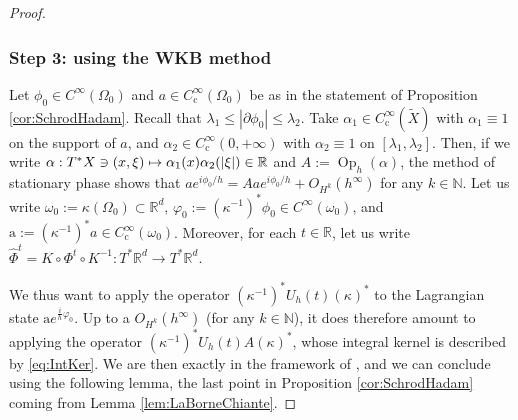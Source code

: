 \documentclass[10pt]{amsart}
\newcommand\mto{\mathchoice{\longmapsto}{\mapsto}{\mapsto}{\mapsto}}
\newcommand{\rc}{\mathrm{c}}
\DeclareMathOperator{\Op}{Op}
\theoremstyle{plain}
\theoremstyle{definition}
\newcommand{\N}{\mathbb{N}}
\newcommand{\R}{\mathbb{R}}
\begin{document}
\begin{proof}
\subsubsection*{Step 3: using the WKB method}
Let $\phi_0\in C^\infty(\Omega_0)$ and $a\in C_\rc^\infty(\Omega_0)$ be as in the statement of Proposition \ref{cor:SchrodHadam}. Recall that $\lambda_1\leq |\partial\phi_0|\leq \lambda_2$.
Take $\alpha_1\in C_\rc^\infty(\tilde{X})$ with $\alpha_1\equiv 1$ on the support of $a$, and $\alpha_2\in C_\rc^\infty(0, +\infty)$ with $\alpha_2\equiv 1$ on $[\lambda_1, \lambda_2]$. Then, if we write $\alpha : T^*X\ni (x,\xi) \mto \alpha_1(x) \alpha_2(|\xi|)\in \R$ and $A:= \Op_h (\alpha)$, the method of stationary phase shows that $a e^{i\phi_0/h} = A a e^{i\phi_0/h} + O_{H^k}(h^\infty)$ for any $k\in\N$. Let us write $\omega_0:= \kappa(\Omega_0)\subset \R^d$, $\varphi_0 := (\kappa^{-1})^*\phi_0\in C^\infty(\omega_0)$, and $\mathrm{a} := (\kappa^{-1})^*a\in C_\rc^\infty(\omega_0)$. Moreover, for each $t\in\R$, let us write $\widehat{\Phi}^t=K\circ\Phi^t\circ K^{-1}:T^*\R^d\to T^*\R^d$.

We thus want to apply the operator $(\kappa^{-1})^* U_h(t)(\kappa)^*$ to the Lagrangian state $\mathrm{a} e^{\frac{i}{h}\varphi_0}$. Up to a $O_{H^k}(h^\infty)$ (for any $k\in\N$), it does therefore amount to applying the operator $ (\kappa^{-1})^* U_h(t)A (\kappa)^*$, whose integral kernel is described by \eqref{eq:IntKer}.
We are then exactly in the framework of \cite[Lem.\,4.1]{NZ}, and we can conclude using the following lemma, the last point in Proposition \ref{cor:SchrodHadam} coming from Lemma \ref{lem:LaBorneChiante}.
\end{proof}
\end{document}
